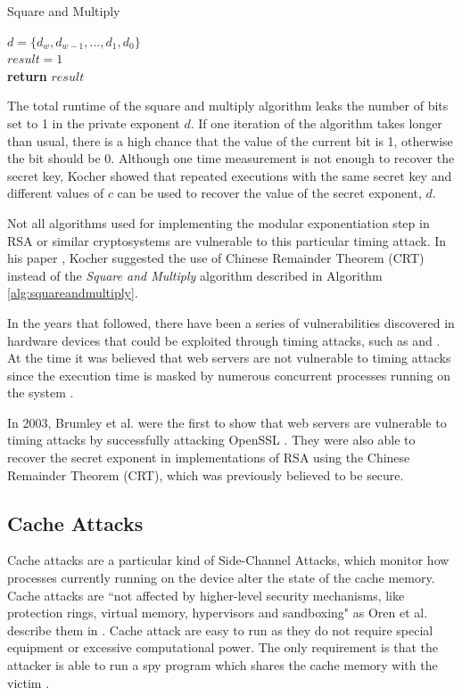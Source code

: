 \documentclass[10pt,a4paper,twoside]{book}
\begin{document}
\begin{algorithm}
\caption{Square and Multiply}
\label{alg:squareandmultiply}
$d = \{d_w, d_{w-1}, ..., d_1, d_0\}$\\
$result = 1$\\
{\bf return} $result$
\end{algorithm}

The total runtime of the square and multiply algorithm leaks the number of bits set to 1 in the private exponent $d$. If one iteration of the algorithm takes longer than usual, there is a high chance that the value of the current bit is 1, otherwise the bit should be 0. Although one time measurement is not enough to recover the secret key, Kocher\cite{kocc2009cryptographic} showed that repeated executions with the same secret key and different values of $c$ can be used to recover the value of the secret exponent, $d$.

Not all algorithms used for implementing the modular exponentiation step in RSA or similar cryptosystems are vulnerable to this particular timing attack. In his paper \cite{kocher1996timing}, Kocher suggested the use of Chinese Remainder Theorem (CRT) instead of the \textit{Square and Multiply} algorithm described in Algorithm \ref{alg:squareandmultiply}.

In the years that followed, there have been a series of vulnerabilities discovered in hardware devices that could be exploited through timing attacks, such as \cite{dhem1998practical} and \cite{schindler2000timing}. At the time it was believed that web servers are not vulnerable to timing attacks since the execution time is masked by numerous concurrent processes running on the system \cite{brumley2005remote}.

In 2003, Brumley et al. \cite{brumley2005remote} were the first to show that web servers are vulnerable to timing attacks by successfully attacking OpenSSL \cite{openssl}. They were also able to recover the secret exponent in implementations of RSA using the Chinese Remainder Theorem (CRT), which was previously believed to be secure. 

\subsection{Cache Attacks}
Cache attacks are a particular kind of Side-Channel Attacks, which monitor how processes currently running on the device alter the state of the cache memory. Cache attacks are ``not affected by higher-level security mechanisms, like protection rings, virtual memory, hypervisors and sandboxing" as Oren et al. describe them in \cite{oren2015spy}. Cache attack are easy to run as they do not require special equipment or excessive computational power. The only requirement is that the attacker is able to run a spy program which shares the cache memory with the victim \cite{oren2015spy}.
\end{document}
